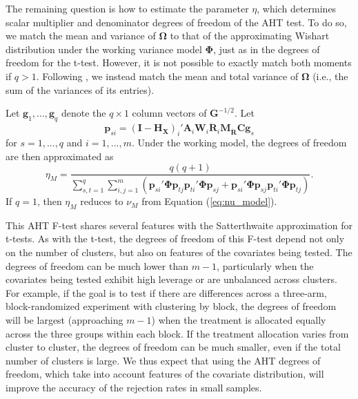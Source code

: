 \documentclass[12pt]{article}\usepackage[]{graphicx}\usepackage[]{color}
\newcommand{\bm}{\mathbf}
\newcommand{\bs}{\boldsymbol}
\begin{document}
The remaining question is how to estimate the parameter $\eta$, which determines scalar multiplier and denominator degrees of freedom of the AHT test. 
To do so, we match the mean and variance of $\bs\Omega$ to that of the approximating Wishart distribution under the working variance model $\bs\Phi$, just as in the degrees of freedom for the t-test. 
However, it is not possible to exactly match both moments if $q > 1$.
Following , we instead match the mean and total variance of $\bs\Omega$ (i.e., the sum of the variances of its entries).

Let $\bm{g}_1,...,\bm{g}_q$ denote the $q \times 1$ column vectors of $\bm{G}^{-1/2}$. 
Let \[
\bm{p}_{si} = \left(\bm{I} - \bm{H_X}\right)_i' \bm{A}_i \bm{W}_i \bm{\ddot{R}}_i \bm{M_{\ddot{R}}}\bm{C} \bm{g}_s \]
for $s = 1,...,q$ and $i = 1,...,m$.
Under the working model, the degrees of freedom are then approximated as
\begin{equation}
\label{eq:eta_model}
\eta_M = \frac{q(q + 1)}{\sum_{s,t=1}^q \sum_{i,j=1}^m \left(\bm{p}_{si}'\bs\Phi\bm{p}_{tj} \bm{p}_{ti}'\bs\Phi\bm{p}_{sj} + \bm{p}_{si}'\bs\Phi\bm{p}_{sj} \bm{p}_{ti}'\bs\Phi\bm{p}_{tj}\right)}.
\end{equation}
If $q = 1$, then $\eta_M$ reduces to $\nu_M$ from Equation (\ref{eq:nu_model}).

This AHT F-test shares several features with the Satterthwaite approximation for t-tests. As with the t-test, the degrees of freedom of this F-test depend not only on the number of clusters, but also on features of the covariates being tested. 
The degrees of freedom can be much lower than $m - 1$, particularly when the covariates being tested exhibit high leverage or are unbalanced across clusters. 
For example, if the goal is to test if there are differences across a three-arm, block-randomized experiment with clustering by block, the degrees of freedom will be largest (approaching $m - 1$) when the treatment is allocated equally across the three groups within each block. 
If the treatment allocation varies from cluster to cluster, the degrees of freedom can be much smaller, even if the total number of clusters is large. 
We thus expect that using the AHT degrees of freedom, which take into account features of the covariate distribution, will improve the accuracy of the rejection rates in small samples. 
\end{document}
